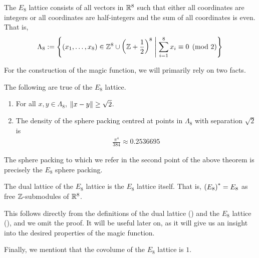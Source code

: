 \begin{boxdefinition}\label{Ch2:Def:E8_Lattice}
    The $E_8$ lattice consists of all vectors in $\mathbb{R}^8$ such that either all coordinates are integers or all coordinates are half-integers and the sum of all coordinates is even. That is,
    \begin{align*}
        \Lambda_8 := \left\{ \left( x_1, \ldots, x_8 \right) \in \mathbb{Z}^8 \cup \left( \mathbb{Z} + \frac{1}{2} \right)^8 \; \middle\vert \; \sum_{i=1}^{8} x_i \equiv 0 \pmod{2} \right\}
    \end{align*}
\end{boxdefinition}

For the construction of the magic function, we will primarily rely on two facts.
\begin{boxtheorem}
    The following are true of the $E_8$ lattice.
    \begin{enumerate}
        \item For all $x, y \in \Lambda_8$, $\left\lVert x - y \right\rVert \geq \sqrt{2}$.
        \item The density of the sphere packing centred at points in $\Lambda_8$ with separation $\sqrt{2}$ is
        \begin{align*}
            \frac{\pi^4}{384} \approx 0.2536695
        \end{align*}
    \end{enumerate}
\end{boxtheorem}

The sphere packing to which we refer in the second point of the above theorem is precisely the $E_8$ sphere packing.


\begin{boxtheorem}\label{Ch2:Thm:E8_Self_Dual}
    The dual lattice of the $E_8$ lattice is the $E_8$ lattice itself. That is, $\left( E_8 \right)^* = E_8$ as free $\mathbb{Z}$-submodules of $\mathbb{R}^8$.
\end{boxtheorem}

This follows directly from the definitions of the dual lattice () and the $E_8$ lattice (), and we omit the proof. It will be useful later on, as it will give us an insight into the desired properties of the magic function.

Finally, we mentiont that the covolume of the $E_8$ lattice is $1$.

